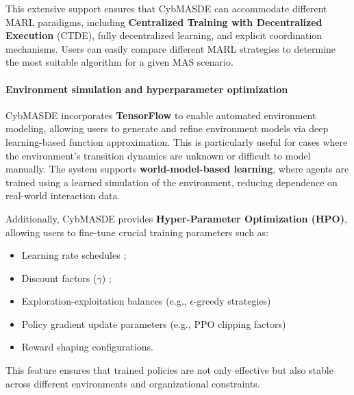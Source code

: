 \documentclass[pdflatex,sn-mathphys-num]{sn-jnl}%
\theoremstyle{thmstyleone}%
\theoremstyle{thmstyletwo}%
\theoremstyle{thmstylethree}%
\begin{document}
This extensive support ensures that CybMASDE can accommodate different MARL paradigms, including \textbf{Centralized Training with Decentralized Execution} (CTDE), fully decentralized learning, and explicit coordination mechanisms. Users can easily compare different MARL strategies to determine the most suitable algorithm for a given MAS scenario.

\paragraph{Environment simulation and hyperparameter optimization}
CybMASDE incorporates \textbf{TensorFlow} to enable automated environment modeling, allowing users to generate and refine environment models via deep learning-based function approximation. This is particularly useful for cases where the environment's transition dynamics are unknown or difficult to model manually. The system supports \textbf{world-model-based learning}, where agents are trained using a learned simulation of the environment, reducing dependence on real-world interaction data.

Additionally, CybMASDE provides \textbf{Hyper-Parameter Optimization (HPO)}, allowing users to fine-tune crucial training parameters such as:
\begin{itemize}
    \item Learning rate schedules ; %
    \item Discount factors ($\gamma$) ; %
    \item Exploration-exploitation balances (e.g., $\epsilon$-greedy strategies)
    \item Policy gradient update parameters (e.g., PPO clipping factors)
    \item Reward shaping configurations.
\end{itemize}

This feature ensures that trained policies are not only effective but also stable across different environments and organizational constraints.
\end{document}
